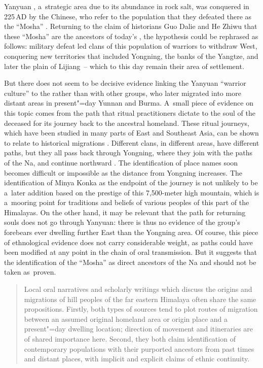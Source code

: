 Yanyuan , a~strategic area due to its abundance in rock salt, was conquered in 225\,AD by the Chinese, who refer to the population that they defeated there as the “Mosha” . Returning to the claim of  historians Guo Dalie and He Zhiwu that these “Mosha” are the ancestors of today's , the hypothesis could be rephrased as follows: military defeat led clans of this population of warriors to withdraw West, conquering new territories that included Yongning, the banks of the Yangtze, and later the plain of Lijiang~-- which to this day remain their area of settlement. 

But there does not seem to be decisive evidence linking the Yanyuan “warrior culture” to the  rather than with other  groups, who later migrated into more distant areas in present"=day Yunnan and Burma. A~small piece of evidence on this topic comes from the path that ritual practitioners dictate to the soul of the deceased for its journey back to the ancestral homeland. These ritual journeys, which have been studied in many parts of East and Southeast Asia, can be shown to relate to historical migrations \citep{blackburn2004, gaenszle2012, mckhann2012}. Different clans, in different  areas, have different paths, but they all pass back through Yongning, where they join with the paths of the Na, and continue northward \citep[50-55]{guoetal1994}. The identification of place names soon becomes difficult or impossible as the distance from Yongning increases. The identification of Minya Konka  as the endpoint of the journey is not unlikely to be a~later addition based on the prestige of this 7,500-meter high mountain, which is a~mooring point for traditions and beliefs of various peoples of this part of the Himalayas. On the other hand, it may be relevant that the path for returning souls does not go through Yanyuan: there is thus no evidence of the group's forebears ever dwelling further East than the Yongning area. Of course, this piece of ethnological evidence does not carry considerable weight, as paths could have been modified at any point in the chain of {oral transmission}. But it suggests that the identification of the “Mosha”  as direct ancestors of the Na and  should not be taken as~proven.

\begin{quotation}
	Local oral narratives and scholarly writings which discuss the origins 
	and migrations of hill peoples of the far eastern Himalaya often share the 
	same propositions. Firstly, both types of sources tend to plot routes of  
	migration between an assumed original homeland area or origin place and 
	a present"=day dwelling location; direction of movement and itineraries 
	are of shared importance here. Second, they both claim identification of
	contemporary populations with their purported ancestors from past times 
	and distant places, with implicit and explicit claims of ethnic continuity. \citep[83]{huber2012}
\end{quotation}

